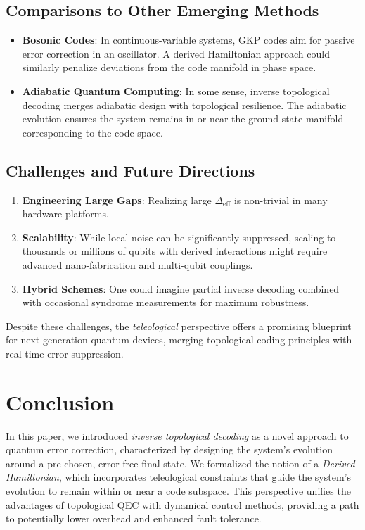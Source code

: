 \documentclass[11pt]{article}
\begin{document}
\subsection{Comparisons to Other Emerging Methods}
\begin{itemize}
    \item \textbf{Bosonic Codes}: In continuous-variable systems, GKP codes \cite{GottesmanGKP} aim for passive error correction in an oscillator. A derived Hamiltonian approach could similarly penalize deviations from the code manifold in phase space.
    \item \textbf{Adiabatic Quantum Computing}: In some sense, inverse topological decoding merges adiabatic design with topological resilience. The adiabatic evolution ensures the system remains in or near the ground-state manifold corresponding to the code space.
\end{itemize}

\subsection{Challenges and Future Directions}
\begin{enumerate}[(1)]
    \item \textbf{Engineering Large Gaps}: Realizing large $\Delta_{\mathrm{eff}}$ is non-trivial in many hardware platforms.
    \item \textbf{Scalability}: While local noise can be significantly suppressed, scaling to thousands or millions of qubits with derived interactions might require advanced nano-fabrication and multi-qubit couplings.
    \item \textbf{Hybrid Schemes}: One could imagine partial inverse decoding combined with occasional syndrome measurements for maximum robustness.
\end{enumerate}

Despite these challenges, the \emph{teleological} perspective offers a promising blueprint for next-generation quantum devices, merging topological coding principles with real-time error suppression.

\section{Conclusion}
In this paper, we introduced \emph{inverse topological decoding} as a novel approach to quantum error correction, characterized by designing the system’s evolution around a pre-chosen, error-free final state. We formalized the notion of a \emph{Derived Hamiltonian}, which incorporates teleological constraints that guide the system’s evolution to remain within or near a code subspace. This perspective unifies the advantages of topological QEC with dynamical control methods, providing a path to potentially lower overhead and enhanced fault tolerance.
\end{document}
